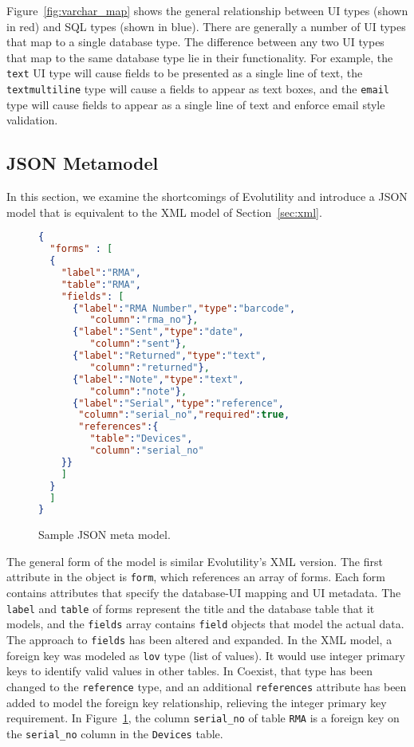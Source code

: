 Figure~\ref{fig:varchar_map} shows the general relationship between UI types
(shown in red) and SQL types (shown in blue). There are generally a number of UI
types that map to a single database type. The difference between any two UI
types that map to the same database type lie in their functionality. For
example, the \texttt{text} UI type will cause fields to be presented as a single
line of text, the \texttt{textmultiline} type will cause a fields to appear as
text boxes, and the \texttt{email} type will cause fields to appear as a single
line of text and enforce email style validation. 




\subsection{JSON Metamodel} \label{sec:json}

In this section, we examine the shortcomings of Evolutility and introduce a JSON
model that is equivalent to the XML model of Section~\ref{sec:xml}. 



\begin{figure}[h!]
\begin{lstlisting}[language=json]
{
  "forms" : [
  {
    "label":"RMA",
    "table":"RMA",
    "fields": [
      {"label":"RMA Number","type":"barcode",
         "column":"rma_no"},
      {"label":"Sent","type":"date",
         "column":"sent"},
      {"label":"Returned","type":"text",
         "column":"returned"},
      {"label":"Note","type":"text",
         "column":"note"},
      {"label":"Serial","type":"reference",
       "column":"serial_no","required":true,
       "references":{
         "table":"Devices",
         "column":"serial_no"
    }}
    ]
  }
  ]
}
\end{lstlisting}
\caption{Sample JSON meta model.}
\label{fig:json_sample}
\end{figure}

The general form of the model is similar Evolutility's XML version. The first
attribute in the object is \texttt{form}, which references an array of forms.
Each form contains attributes that specify the database-UI mapping and UI
metadata. The \texttt{label} and \texttt{table} of forms represent the title and
the database table that it models, and the \texttt{fields} array contains
\texttt{field} objects that model the actual data. The approach to
\texttt{fields} has been altered and expanded. In the XML model, a foreign key
was modeled as \texttt{lov} type (list of values). It would use integer primary
keys to identify valid values in other tables. In Coexist, that type has been
changed to the \texttt{reference} type, and an additional \texttt{references}
attribute has been added to model the foreign key relationship, relieving the
integer primary key requirement. In Figure~\ref{fig:json_sample}, the column
\texttt{serial\_no} of table \texttt{RMA} is a foreign key on the
\texttt{serial\_no} column in the \texttt{Devices} table. 

